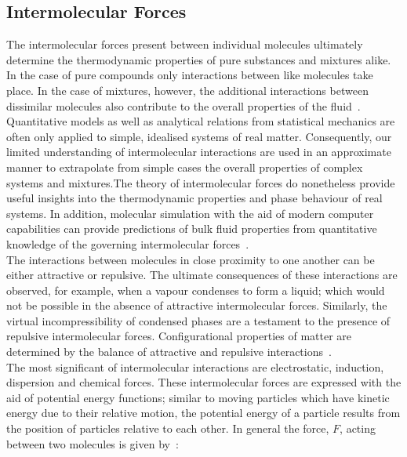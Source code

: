 \subsection{Intermolecular Forces}

The intermolecular forces present between individual molecules ultimately determine the thermodynamic properties of pure substances and mixtures alike. In the case of pure compounds only interactions between like molecules take place. In the case of mixtures, however, the additional interactions between dissimilar molecules also contribute to the overall properties of the fluid~\cite{MolecularThermodynamicsOfFluidPhaseEquilibria, GasLiquidProperties}.\\

Quantitative models as well as analytical relations from statistical mechanics are often only applied to simple, idealised systems of real matter. Consequently, our limited understanding of intermolecular interactions are used in an approximate manner to extrapolate from simple cases the overall properties of complex systems and mixtures.The theory of intermolecular forces do nonetheless provide useful insights into the thermodynamic properties and phase behaviour of real systems. In addition, molecular simulation with the aid of modern computer capabilities can provide predictions of bulk fluid properties from quantitative knowledge of the governing intermolecular forces~\cite{MolecularThermodynamicsOfFluidPhaseEquilibria}.\\

The interactions between molecules in close proximity to one another can be either attractive or repulsive. The ultimate consequences of these interactions are observed, for example, when a vapour condenses to form a liquid; which would not be possible in the absence of attractive intermolecular forces. Similarly, the virtual incompressibility of condensed phases are a testament to the presence of repulsive intermolecular forces. Configurational properties of matter are determined by the balance of attractive and repulsive interactions~\cite{MolecularThermodynamicsOfFluidPhaseEquilibria}.\\

The most significant of intermolecular interactions are electrostatic, induction, dispersion and chemical forces. These intermolecular forces are expressed with the aid of potential energy functions; similar to moving particles which have kinetic energy due to their relative motion, the potential energy of a particle results from the position of particles relative to each other. In general the force, $F$, acting between two molecules is given by~\cite{MolecularThermodynamicsOfFluidPhaseEquilibria}:\

